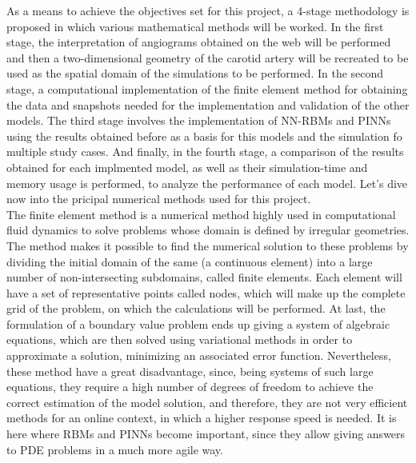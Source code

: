 \documentclass[12pt,letterpaper]{article}
\begin{document}
As a means to achieve the objectives set for this project, a 4-stage methodology is proposed in which
various mathematical methods will be worked. In the first stage, the interpretation of angiograms
obtained on the web will be performed and then a two-dimensional geometry of the carotid artery will
be recreated to be used as the spatial domain of the simulations to be performed. In the second stage, 
a computational implementation of the finite element method for obtaining the data and snapshots needed for 
the implementation and validation of the other models. The third stage involves the implementation of NN-RBMs 
and PINNs using the results obtained before as a basis for this models and the simulation fo multiple study 
cases. And finally, in the fourth stage, a comparison of the results obtained for each implmented model, as 
well as their simulation-time and memory usage is performed, to analyze the performance of each model. Let's dive now into the pricipal numerical methods used for this project.\\

The finite element method is a numerical method highly used in computational fluid dynamics to solve problems whose domain is defined by irregular geometries. The method makes it possible to find the numerical solution to these problems by dividing the initial domain of the same (a continuous element) into a large number of non-intersecting subdomains, called finite elements. Each element will have a set of representative points called nodes, which will make up the complete grid of the problem, on which the calculations will be performed. At last, the formulation of a boundary value problem ends up giving a system of algebraic equations, which are then solved using variational methods in order to approximate a solution, minimizing an associated error function\cite{element}. Nevertheless, these method have a great disadvantage, since, being systems of such large equations, they require a high number of degrees of freedom to achieve the correct estimation of the model solution, and therefore, they are not very efficient methods for an online context, in which a higher response speed is needed. It is here where RBMs and PINNs become important, since they allow giving answers to PDE problems in a much more agile way.\\
\end{document}
